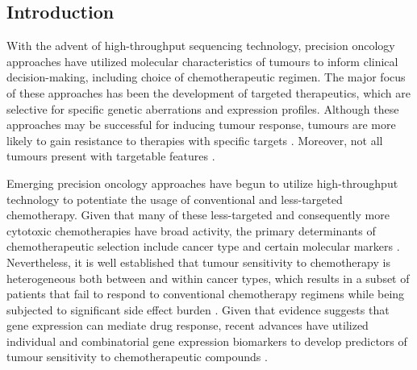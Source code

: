 \documentclass[10pt, letterpaper]{article}
\begin{document}
\begin{multicols*}{2}
\section{Introduction}
With the advent of high-throughput sequencing technology, precision oncology approaches have utilized molecular characteristics of tumours to inform clinical decision-making, including choice of chemotherapeutic regimen. The major focus of these approaches has been the development of targeted therapeutics, which are selective for specific genetic aberrations and expression profiles. Although these approaches may be successful for inducing tumour response, tumours are more likely to gain resistance to therapies with specific targets \cite{small_mol}. Moreover, not all tumours present with targetable features \cite{small_mol}.

Emerging precision oncology approaches have begun to utilize high-throughput technology to potentiate the usage of conventional and less-targeted chemotherapy. Given that many of these less-targeted and consequently more cytotoxic chemotherapies have broad activity, the primary determinants of chemotherapeutic selection include cancer type and certain molecular markers \cite{adverse}. Nevertheless, it is well established that tumour sensitivity to chemotherapy is heterogeneous both between and within cancer types, which results in a subset of patients that fail to respond to conventional chemotherapy regimens while being subjected to significant side effect burden \cite{adjuvant}. Given that evidence suggests that gene expression can mediate drug response, recent advances have utilized individual and combinatorial gene expression biomarkers to develop predictors of tumour sensitivity to chemotherapeutic compounds \cite{integrated}.


\end{multicols*}
\end{document}
